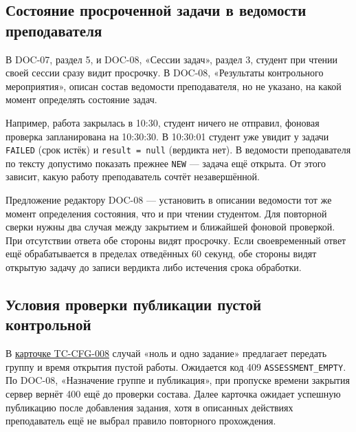 \documentclass[12pt,a4paper]{article}
\begin{document}
\hypertarget{замечания-к-разбору}{}

\subsection{Состояние просроченной задачи в ведомости преподавателя}\label{1-ux441ux43eux441ux442ux43eux44fux43dux438ux435-ux43fux440ux43eux441ux440ux43eux447ux435ux43dux43dux43eux439-ux437ux430ux434ux430ux447ux438-ux432-ux432ux435ux434ux43eux43cux43eux441ux442ux438-ux43fux440ux435ux43fux43eux434ux430ux432ux430ux442ux435ux43bux44f}

\hypertarget{1-состояние-просроченной-задачи-в-ведомости-преподавателя}{}

В DOC-07, раздел 5, и DOC-08, «Сессии задач», раздел 3, студент при чтении своей сессии сразу видит просрочку. В DOC-08, «Результаты контрольного мероприятия», описан состав ведомости преподавателя, но не указано, на какой момент определять состояние задач.

Например, работа закрылась в 10:30, студент ничего не отправил, фоновая проверка запланирована на 10:30:30. В 10:30:01 студент уже увидит у задачи \texttt{FAILED} (срок истёк) и \texttt{result\ =\ null} (вердикта нет). В ведомости преподавателя по тексту допустимо показать прежнее \texttt{NEW} --- задача ещё открыта. От этого зависит, какую работу преподаватель сочтёт незавершённой.

Предложение редактору DOC-08 --- установить в описании ведомости тот же момент определения состояния, что и при чтении студентом. Для повторной сверки нужны два случая между закрытием и ближайшей фоновой проверкой. При отсутствии ответа обе стороны видят просрочку. Если своевременный ответ ещё обрабатывается в пределах отведённых 60 секунд, обе стороны видят открытую задачу до записи вердикта либо истечения срока обработки.

\subsection{Условия проверки публикации пустой контрольной}\label{2-ux443ux441ux43bux43eux432ux438ux44f-ux43fux440ux43eux432ux435ux440ux43aux438-ux43fux443ux431ux43bux438ux43aux430ux446ux438ux438-ux43fux443ux441ux442ux43eux439-ux43aux43eux43dux442ux440ux43eux43bux44cux43dux43eux439}

\hypertarget{2-условия-проверки-публикации-пустой-контрольной}{}

В {\href{../10\_Верификация\_и\_тестирование/DOC-10\_План\_верификации.pdf\#tc-cfg-008}{карточке TC-CFG-008}} случай «ноль и одно задание» предлагает передать группу и время открытия пустой работы. Ожидается код 409 \texttt{ASSESSMENT\_\allowbreak{}EMPTY}. По DOC-08, «Назначение группе и публикация», при пропуске времени закрытия сервер вернёт 400 ещё до проверки состава. Далее карточка ожидает успешную публикацию после добавления задания, хотя в описанных действиях преподаватель ещё не выбрал правило повторного прохождения.
\end{document}
